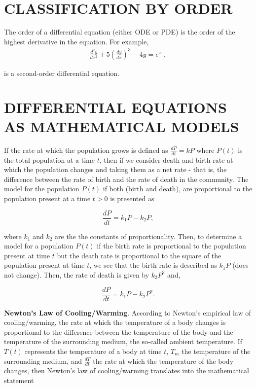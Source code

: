\documentclass[12pt]{report}
\begin{document}
		\section{CLASSIFICATION BY ORDER}

		\par The order of a differential equation (either ODE or PDE) is the order of the highest derivative in the equation. For example,
		\begin{align*}
			\frac{d^{2}y}{dx^{2}} + 5 \left( \frac{dy}{dx} \right)^3 - 4y = e^{x} \; ,
		\end{align*}
		\par is a second-order differential equation.

		\section{DIFFERENTIAL EQUATIONS AS MATHEMATICAL MODELS}

		If the rate at which the population grows is defined as $\frac{dP}{dt} = kP$ where $P(t)$ is the total population at a time $t$, then if we consider death and birth rate at which the population changes and taking them as a net rate - that is, the difference between the rate of birth and the rate of death in the community. The model for the population $P(t)$ if both (birth and death), are proportional to the population present at a time $t > 0$ is presented as

		\begin{equation}
			\frac{dP}{dt} = k_1P - k_2P,
		\end{equation}

		where $k_1$ and $k_2$ are the the constants of proportionality. Then, to determine a model for a population $P(t)$ if the birth rate is proportional to the population present at time $t$ but the death rate is proportional to the square of the population present at time $t$, we see that the birth rate is described as $k_1 P$ (does not change). Then, the rate of death is given by $k_2 P^2$ and,

		\begin{equation}
			\frac{dP}{dt} = k_1P - k_2P^2.
		\end{equation}

		\par \textbf{Newton's Law of Cooling/Warming}. According to Newton's empirical law of cooling/warming, the rate at which the temperature of a body changes is proportional to the difference between the temperature of the body and the temperature of the surrounding medium, the so-called ambient temperature. If $T(t)$ represents the temperature of a body at time $t$, $T_m$ the temperature of the surrounding medium, and $\frac{dT}{dt}$ the rate at which the temperature of the body changes, then Newton's law of cooling/warming translates into the mathematical statement
\end{document}
